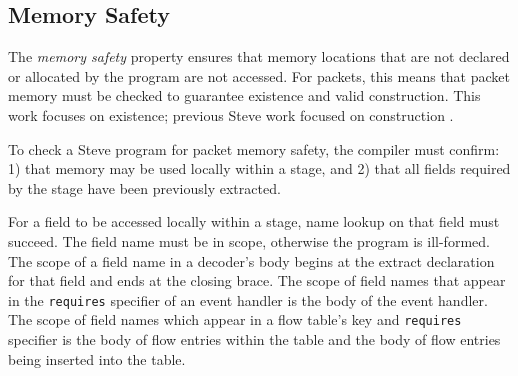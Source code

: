 %
%

\subsection{Memory Safety} \label{guide:requirements}

The \emph{memory safety} property ensures that memory locations that are not declared or allocated by the program are not accessed. For packets, this means that packet memory must be checked to guarantee existence and valid construction. This work focuses on existence; previous Steve work focused on construction \cite{wripe}.

To check a Steve program for packet memory safety, the compiler must confirm: 1) that memory may be used locally within a stage, and 2) that all fields required by the stage have been previously extracted.

For a field to be accessed locally within a stage, name lookup on that field must succeed. The field name must be in scope, otherwise the program is ill-formed.
The scope of a field name in a decoder's body begins at the extract declaration for that field and ends at the closing brace.
The scope of field names that appear in the \texttt{requires} specifier of an event handler is the body of the event handler.
The scope of field names which appear in a flow table's key and \texttt{requires} specifier is the body of flow entries within the table and the body of flow entries being inserted into the table.


